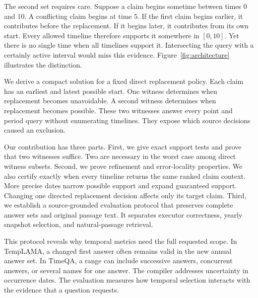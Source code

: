 The second set requires care.
Suppose a claim begins sometime between times 0 and 10.
A conflicting claim begins at time 5.
If the first claim begins earlier, it contributes before the replacement.
If it begins later, it contributes from its own start.
Every allowed timeline therefore supports it somewhere in $[0,10]$.
Yet there is no single time when all timelines support it.
Intersecting the query with a certainly active interval would miss this evidence.
Figure~\ref{fig:architecture} illustrates the distinction.

We derive a compact solution for a fixed direct replacement policy.
Each claim has an earliest and latest possible start.
One witness determines when replacement becomes unavoidable.
A second witness determines when replacement becomes possible.
These two witnesses answer every point and period query without enumerating timelines.
They expose which source decisions caused an exclusion.

Our contribution has three parts.
First, we give exact support tests and prove that two witnesses suffice.
Two are necessary in the worst case among direct witness subsets.
Second, we prove refinement and error-locality properties.
We also certify exactly when every timeline returns the same ranked claim context.
More precise dates narrow possible support and expand guaranteed support.
Changing one directed replacement decision affects only its target claim.
Third, we establish a source-grounded evaluation protocol that preserves complete answer sets and original passage text.
It separates executor correctness, yearly snapshot selection, and natural-passage retrieval.

This protocol reveals why temporal metrics need the full requested scope.
In TempLAMA, a changed first answer often remains valid in the new annual answer set.
In TimeQA, a range can include successive answers, concurrent answers, or several names for one answer.
The compiler addresses uncertainty in occurrence dates.
The evaluation measures how temporal selection interacts with the evidence that a question requests.
